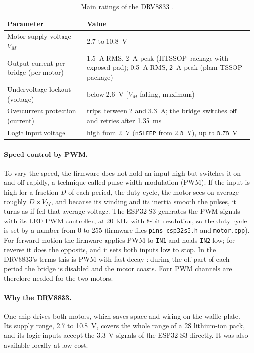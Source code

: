 \begin{table}[htbp]
  \centering
  \caption[Main ratings of the DRV8833]{Main ratings of the DRV8833 \cite{drv8833_datasheet}.}
  \label{tab:drv8833}
  \begin{tabularx}{\textwidth}{@{}l X@{}}
    \toprule
    Parameter & Value \\
    \midrule
    Motor supply voltage \(V_M\) & 2.7 to 10.8~V \\
    Output current per bridge (per motor) & 1.5~A RMS, 2~A peak (HTSSOP package with
                                 exposed pad); 0.5~A RMS, 2~A peak (plain TSSOP package) \\
    Undervoltage lockout (voltage) & below 2.6~V (\(V_M\) falling, maximum) \\
    Overcurrent protection (current) & trips between 2 and 3.3~A; the bridge switches off and retries
                             after 1.35~ms \\
    Logic input voltage & high from 2~V (\texttt{nSLEEP} from 2.5~V), up to 5.75~V \\
    \bottomrule
  \end{tabularx}
\end{table}

\paragraph{Speed control by PWM.} To vary the speed, the firmware does not hold an input
high but switches it on and off rapidly, a technique called pulse-width modulation (PWM).
If the input is high for a fraction \(D\) of each period, the duty cycle, the motor sees
on average roughly \(D \times V_M\), and because its winding and its inertia smooth the
pulses, it turns as if fed that average voltage. The ESP32-S3 generates the PWM signals
with its LED PWM controller, at 20~kHz with 8-bit resolution, so the duty cycle is set
by a number from 0 to 255 (firmware files \texttt{pins\_esp32s3.h} and
\texttt{motor.cpp}). For forward motion the firmware applies PWM to \texttt{IN1} and holds
\texttt{IN2} low; for reverse it does the opposite, and it sets both inputs low to stop.
In the DRV8833's terms this is PWM with fast decay \cite{drv8833_datasheet}: during the
off part of each period the bridge is disabled and the motor coasts. Four PWM channels
are therefore needed for the two motors.

\paragraph{Why the DRV8833.} One chip drives both motors, which saves space and wiring on
the waffle plate. Its supply range, 2.7 to 10.8~V, covers the whole range of a 2S
lithium-ion pack, and its logic inputs accept the 3.3~V signals of the ESP32-S3
directly. It was also available locally at low cost.

